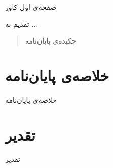 \documentclass{article}[a4paper, 11px]
\newcommand*{\chapters}{./chapters}
\begin{document}
صفحه‌ی اول کاور

\newpage


تقدیم به ...

\newpage


\begin{abstract}
چکیده‌ی پایان‌نامه
\end{abstract}
\newpage

\section*{
خلاصه‌ی پایان‌نامه
}

خلاصه‌ی پایان‌نامه
\newpage

\section*{
تقدیر
}

تقدیر
\newpage


\tableofcontents

\newpage


\listoffigures

\newpage
 
 
\listoftables

\newpage






























\end{document}
